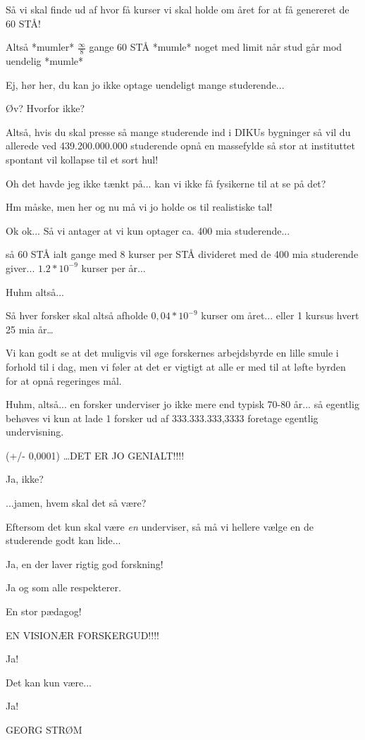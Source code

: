 \documentclass[a4paper,11pt]{article}
\begin{document}
\begin{sketch}
 Så vi skal finde ud af hvor få kurser vi skal holde om året for at
få genereret de 60 STÅ!

 Altså *mumler* $\frac{\infty}{8}$ gange 60 STÅ *mumle* noget med limit når
stud går mod uendelig *mumle*

 Ej, hør her, du kan jo ikke optage uendeligt mange studerende...

 Øv? Hvorfor ikke?

 Altså, hvis du skal presse så mange studerende ind i DIKUs
bygninger så vil du allerede ved 439.200.000.000 studerende opnå en
massefylde så stor at instituttet spontant vil kollapse til et sort
hul!

 Oh det havde jeg ikke tænkt på... kan vi ikke få fysikerne til at se på det?

 Hm måske, men her og nu må vi jo holde os til realistiske tal!

 Ok ok... Så vi antager at vi kun optager ca. 400 mia studerende...

        så 60 STÅ ialt gange med 8 kurser per STÅ divideret med de 400 mia
studerende giver...  $1.2*10^{-9}$ kurser per år...

        Huhm altså...

        Så hver forsker skal altså afholde $0,04*10^{-9}$ kurser om året...
eller 1 kursus hvert 25 mia år\dots

 Vi kan godt se at det muligvis vil øge forskernes arbejdsbyrde en
lille smule i forhold til i dag, men vi føler at det er vigtigt at
alle er med til at løfte byrden for at opnå regeringes mål.

 Huhm, altså... en forsker underviser jo ikke mere end typisk 70-80 år...
så egentlig behøves vi kun at lade 1 forsker ud af 333.333.333,3333 foretage egentlig undervisning.

 (+/- 0,0001) \ldots DET ER JO GENIALT!!!!

 Ja, ikke?

 ...jamen, hvem skal det så være?

 Eftersom det kun skal være \emph{en} underviser, så må vi hellere vælge en de
studerende godt kan lide...

 Ja, en der laver rigtig god forskning!

 Ja og som alle respekterer.

 En stor pædagog!

 EN VISIONÆR FORSKERGUD!!!!

 Ja!

 Det kan kun være...

 Ja!

 GEORG STRØM


\end{sketch}
\end{document}
